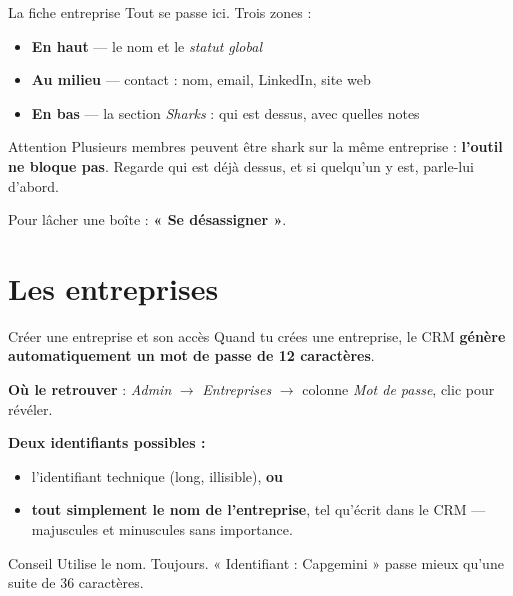 \documentclass[aspectratio=169,11pt]{beamer}
\newcommand{\cle}[1]{\textbf{\textcolor{noirApp}{#1}}}
\begin{document}
\begin{frame}{La fiche entreprise}
  Tout se passe ici. Trois zones :

  \begin{itemize}
    \item \cle{En haut} --- le nom et le \emph{statut global}
    \item \cle{Au milieu} --- contact : nom, email, LinkedIn, site web
    \item \cle{En bas} --- la section \emph{Sharks} : qui est dessus, avec
          quelles notes
  \end{itemize}

  \vfill
  \begin{alertblock}{Attention}
    Plusieurs membres peuvent être shark sur la même entreprise :
    \textbf{l'outil ne bloque pas}. Regarde qui est déjà dessus, et si quelqu'un
    y est, parle-lui d'abord.
  \end{alertblock}

  \vspace{0.2em}
  {\small Pour lâcher une boîte : \textbf{« Se désassigner »}.}
\end{frame}

\section{Les entreprises}

\begin{frame}{Créer une entreprise et son accès}
  Quand tu crées une entreprise, le CRM \cle{génère automatiquement un mot de
  passe de 12 caractères}.

  \vspace{0.4em}
  \cle{Où le retrouver} : \emph{Admin} $\rightarrow$ \emph{Entreprises}
  $\rightarrow$ colonne \emph{Mot de passe}, clic pour révéler.

  \vspace{0.6em}
  \cle{Deux identifiants possibles :}
  \begin{itemize}
    \item l'identifiant technique (long, illisible), \textbf{ou}
    \item \cle{tout simplement le nom de l'entreprise}, tel qu'écrit dans le
          CRM --- majuscules et minuscules sans importance.
  \end{itemize}

  \vfill
  \begin{block}{Conseil}
    Utilise le nom. Toujours. « Identifiant : Capgemini » passe mieux qu'une
    suite de 36 caractères.
  \end{block}
\end{frame}
\end{document}
